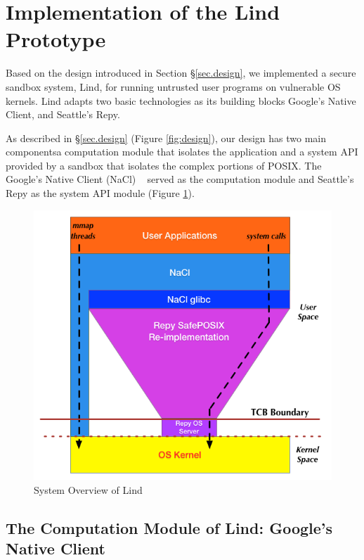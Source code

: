 \section{Implementation of the Lind Prototype}
\label{sec.implementation}

Based on the design introduced in Section \S{\ref{sec.design}}, 
we implemented a secure sandbox system, Lind, 
for running untrusted user programs on vulnerable OS kernels. 
Lind adapts two basic technologies as its building blocks\textendash 
Google's Native Client, and Seattle's Repy. 

As described in \S{\ref{sec.design}} (Figure \ref{fig:design}), our design has
two main components\textendash a computation module that isolates the 
application and a system API provided by a sandbox that isolates the complex 
portions of POSIX.
The Google's Native Client (NaCl) ~\cite{NaCl-09} served as the computation 
module 
and Seattle's Repy as the system API module (Figure \ref{fig:architecture}).

\begin{figure}%
\centering
\includegraphics[width=1.0\columnwidth]{diagram/lind_architecture.png}
\caption{System Overview of Lind}
\label{fig:architecture}
\end{figure}

\subsection{The Computation Module of Lind: Google's Native Client}

